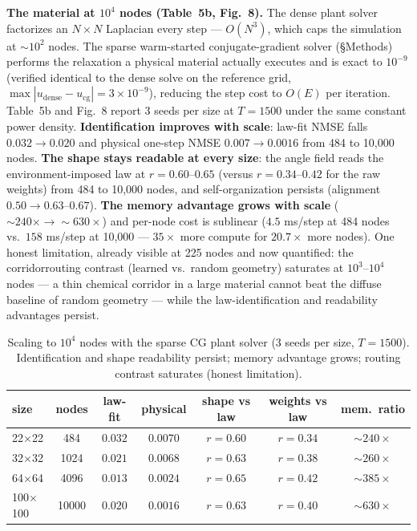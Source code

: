 \documentclass[10pt]{article}
\begin{document}
\textbf{The material at $10^4$ nodes (Table~5b, Fig.~8).} The dense plant solver
factorizes an $N \times N$ Laplacian every step --- $O(N^3)$, which caps the
simulation at ${\sim}10^2$ nodes. The sparse warm-started conjugate-gradient solver
(\S Methods) performs the relaxation a physical material actually executes and is
exact to $10^{-9}$ (verified identical to the dense solve on the reference grid,
$\max|u_{\mathrm{dense}} - u_{\mathrm{cg}}| = 3{\times}10^{-9}$), reducing the
step cost to $O(E)$ per iteration. Table~5b and Fig.~8 report 3 seeds per size at
$T = 1500$ under the same constant power density. \textbf{Identification improves with
scale}: law-fit NMSE falls $0.032 \to 0.020$ and physical one-step NMSE
$0.007 \to 0.0016$ from 484 to 10,000 nodes. \textbf{The shape stays readable at
every size}: the angle field reads the environment-imposed law at
$r = 0.60$--$0.65$ (versus $r = 0.34$--$0.42$ for the raw weights) from 484 to
10,000 nodes, and self-organization persists (alignment $0.50 \to 0.63$--$0.67$).
\textbf{The memory advantage grows with scale} (${\sim}240\times \to {\sim}630\times$)
and per-node cost is sublinear ($4.5$ ms/step at 484 nodes vs.\ $158$ ms/step at
10,000 --- $35\times$ more compute for $20.7\times$ more nodes). One honest
limitation, already visible at 225 nodes and now quantified: the corridor\-routing
contrast (learned vs.\ random geometry) saturates at $10^3$--$10^4$ nodes --- a
thin chemical corridor in a large material cannot beat the diffuse baseline of
random geometry --- while the law-identification and readability advantages persist.

\begin{table}[h]
\centering\footnotesize
\caption{Scaling to $10^4$ nodes with the sparse CG plant solver (3 seeds per
size, $T = 1500$). Identification and shape readability persist; memory
advantage grows; routing contrast saturates (honest limitation).}
\begin{tabular}{lcccccc}
\toprule
size & nodes & law-fit & physical & shape vs law & weights vs law & mem.\ ratio \\
\midrule
22$\times$22 & 484 & $0.032$ & $0.0070$ & $r = 0.60$ & $r = 0.34$ & ${\sim}240\times$ \\
32$\times$32 & 1024 & $0.021$ & $0.0068$ & $r = 0.63$ & $r = 0.38$ & ${\sim}260\times$ \\
64$\times$64 & 4096 & $0.013$ & $0.0024$ & $r = 0.65$ & $r = 0.42$ & ${\sim}385\times$ \\
100$\times$100 & 10000 & $0.020$ & $0.0016$ & $r = 0.63$ & $r = 0.40$ & ${\sim}630\times$ \\
\bottomrule
\end{tabular}
\end{table}
\end{document}
